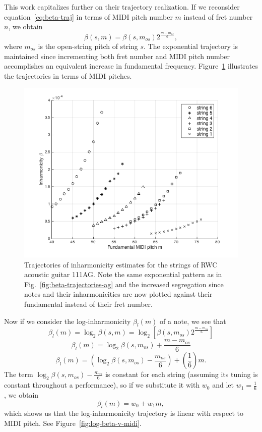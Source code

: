 \documentclass[12pt]{cmuthesis}
\begin{document}
This work capitalizes further on their trajectory realization. If we reconsider equation~\eqref{eq:beta-traj} in terms of MIDI pitch number $m$ instead of fret number $n$, we obtain
\begin{equation}
\beta(s,m) = \beta(s,m_{os})2^{\frac{m-m_{os}}{6}},
\end{equation}
where $m_{os}$ is the open-string pitch of string $s$. The exponential trajectory is maintained since incrementing both fret number and MIDI pitch number accomplishes an equivalent increase in fundamental frequency. Figure~\ref{fig:beta-v-midi} illustrates the trajectories in terms of MIDI pitches.

\begin{figure}[h] 
\label{fig:beta-v-midi}
\centering
\includegraphics[scale=0.7]{beta-v-midi}
\caption{Trajectories of inharmonicity estimates for the strings of RWC acoustic guitar 111AG. Note the same exponential pattern as in Fig.~\ref{fig:beta-trajectories-ag} and the increased segregation since notes and their inharmonicities are now plotted against their fundamental instead of their fret number.}
\end{figure}

 Now if we consider the log-inharmonicity $\beta_{l}(m)$ of a note, we see that
\begin{equation}
\beta_l(m) = \log_2\beta(s,m) = \log_2[\beta(s,m_{os})2^{\frac{m-m_{os}}{6}}]
\end{equation}
\begin{equation}
\beta_l(m) = \log_2\beta(s,m_{os}) + \frac{m-m_{os}}{6}
\end{equation}
\begin{equation}
\beta_l(m) = (\log_2\beta(s,m_{os})-\frac{m_{os}}{6}) + (\frac{1}{6})m.
\end{equation}
The term $\log_2\beta(s,m_{os})-\frac{m_{os}}{6}$ is constant for each string (assuming its tuning is constant throughout a performance), so if we substitute it with $w_0$ and let $w_1 = \frac{1}{6}$, we obtain
\begin{equation}
\beta_l(m) = w_0 + w_1m,
\end{equation}
which shows us that the log-inharmonicity trajectory is linear with respect to MIDI pitch. See Figure~\ref{fig:log-beta-v-midi}.
\end{document}
